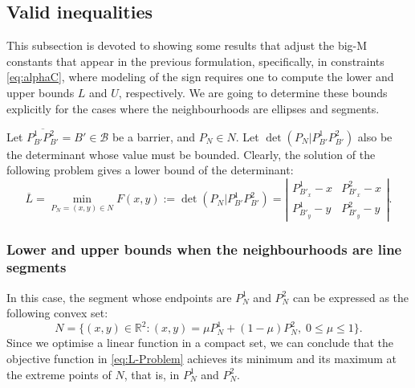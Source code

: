 \documentclass[a4paper,  review, authoryear, 1p.]{elsarticle}
\newcommand{\B}{{\mathcal B}}
\newcommand{\determinant}[3]{\det({#1|#2#3})}
\begin{document}
	\subsection{Valid inequalities}
	This subsection is devoted to showing some results that adjust the big-M constants that appear in the previous formulation, specifically, in constraints \eqref{eq:alphaC}, where modeling of the sign requires one to compute the lower and upper bounds $L$ and $U$, respectively. We are going to determine these bounds explicitly for the cases where the neighbourhoods are ellipses and segments.
	
	Let $\overline{P^1_{B'}P^2_{B'}}=B'\in\B$ be a barrier, and $P_N\in N$. Let $\determinant{P_N}{P_{B'}^1}{P_{B'}^2}$ also be the determinant whose value must be bounded. Clearly, the solution of the following problem gives a lower bound of the determinant:
	\begin{equation*}\label{eq:L-Problem}\tag{L-Problem}
		\overline{L}=\min_{P_N=(x,y)\in N}F(x,y):=\determinant{P^{}_N}{P_{B'}^1}{P_{B'}^2}=\left|
		\begin{array}{cc}
			P^{1}_{B'_x}-x & P^{2}_{B'_x}-x \\
			P^{1}_{B'_y}-y & P^{2}_{B'_y}-y
		\end{array}
		\right|.
	\end{equation*}
	
	\subsubsection{Lower and upper bounds when the neighbourhoods are line segments}
	In this case, the segment whose endpoints are $P^1_{N}$ and $P^2_{N}$ can be expressed as the following convex set:
	$$N=\{(x,y)\in\mathbb R^2:(x,y)=\mu P^1_{N}+(1-\mu)P^2_{N}, \; 0\leq\mu\leq1\}.$$
	Since we optimise a linear function in a compact set, we can conclude that the objective function in \eqref{eq:L-Problem} achieves its minimum and its maximum at the extreme points of $N$, that is, in $P^1_{N}$ and $P^2_{N}$. 
	
\end{document}
